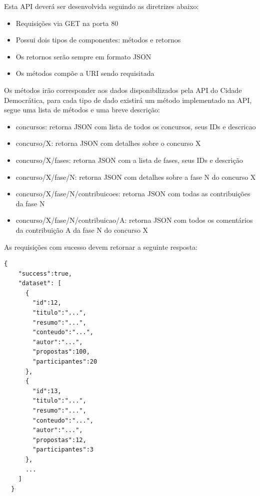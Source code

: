 \documentclass[12pt]{article}
\begin{document}
Esta API deverá ser desenvolvida seguindo as diretrizes abaixo:

\begin{itemize}
  \item Requisições via GET na porta 80
  \item Possui dois tipos de componentes: métodos e retornos
  \item Os retornos serão sempre em formato JSON
  \item Os métodos compõe a URI sendo requisitada
\end{itemize}

Os métodos irão corresponder aos dados disponibilizados pela API do Cidade
Democrática, para cada tipo de dado existirá um método implementado na API,
segue uma lista de métodos e uma breve descrição:

\begin{itemize}
  \item concursos: retorna JSON com lista de todos os concursos, seus IDs e descricao
  \item concurso/X: retorna JSON com detalhes sobre o concurso X
  \item concurso/X/fases: retorna JSON com a lista de fases, seus IDs e descrição
  \item concurso/X/fase/N: retorna JSON com detalhes sobre a fase N do concurso X
  \item concurso/X/fase/N/contribuicoes: retorna JSON com todas as contribuições da fase N
  \item concurso/X/fase/N/contribuicao/A: retorna JSON com todos os comentários da contribuição A da fase N do concurso X
\end{itemize}

As requisições com sucesso devem retornar a seguinte resposta:


\begin{framed}
\begin{lstlisting}[caption=Exemplo de retorno JSON com a lista de todos os concursos]
  {
    "success":true,
    "dataset": [
      {
        "id":12,
        "titulo":"...",
        "resumo":"...",
        "conteudo":"...",
        "autor":"...",
        "propostas":100,
        "participantes":20
      },
      {
        "id":13,
        "titulo":"...",
        "resumo":"...",
        "conteudo":"...",
        "autor":"...",
        "propostas":12,
        "participantes":3
      },
      ...
    ]
  }
\end{lstlisting}
\end{framed}
\end{document}
